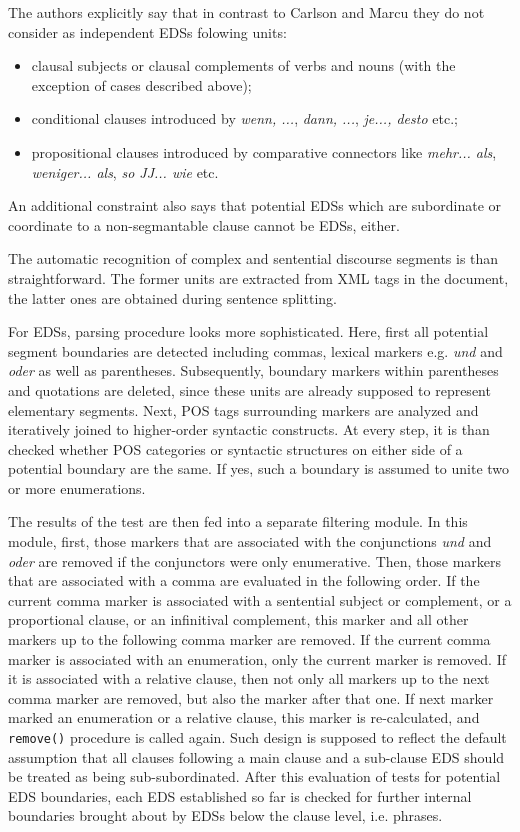 \documentclass[a4paper,11pt]{article}
\begin{document}
The authors explicitly say that in contrast to Carlson and Marcu
\cite{Carlson-Marcu-01} they do not consider as independent EDSs folowing
units:
\begin{itemize}
  \item clausal subjects or clausal complements of verbs and nouns (with the
    exception of cases described above);
  \item conditional clauses introduced by \textit{wenn, ...}, \textit{dann,
    ...}, \textit{je..., desto} etc.;
  \item propositional clauses introduced by comparative connectors like
    \textit{mehr... als}, \textit{weniger... als}, \textit{so JJ... wie} etc.
\end{itemize}
An additional constraint also says that potential EDSs which are subordinate
or coordinate to a non-segmantable clause cannot be EDSs, either.

The automatic recognition of complex and sentential discourse segments is than
straightforward.  The former units are extracted from XML tags in the
document, the latter ones are obtained during sentence splitting.

For EDSs, parsing procedure looks more sophisticated.  Here, first all
potential segment boundaries are detected including commas, lexical markers
e.g. \textit{und} and \textit{oder} as well as parentheses.  Subsequently,
boundary markers within parentheses and quotations are deleted, since these
units are already supposed to represent elementary segments.  Next, POS tags
surrounding markers are analyzed and iteratively joined to higher-order
syntactic constructs.  At every step, it is than checked whether POS
categories or syntactic structures on either side of a potential boundary are
the same.  If yes, such a boundary is assumed to unite two or more
enumerations.

The results of the test are then fed into a separate filtering module.  In
this module, first, those markers that are associated with the conjunctions
\textit{und} and \textit{oder} are removed if the conjunctors were only
enumerative.  Then, those markers that are associated with a comma are
evaluated in the following order.  If the current comma marker is associated
with a sentential subject or complement, or a proportional clause, or an
infinitival complement, this marker and all other markers up to the following
comma marker are removed.  If the current comma marker is associated with an
enumeration, only the current marker is removed.  If it is associated with a
relative clause, then not only all markers up to the next comma marker are
removed, but also the marker after that one.  If next marker marked an
enumeration or a relative clause, this marker is re-calculated, and
\texttt{remove()} procedure is called again.  Such design is supposed to
reflect the default assumption that all clauses following a main clause and a
sub-clause EDS should be treated as being sub-subordinated.  After this
evaluation of tests for potential EDS boundaries, each EDS established so far
is checked for further internal boundaries brought about by EDSs below the
clause level, i.e. phrases.
\end{document}
